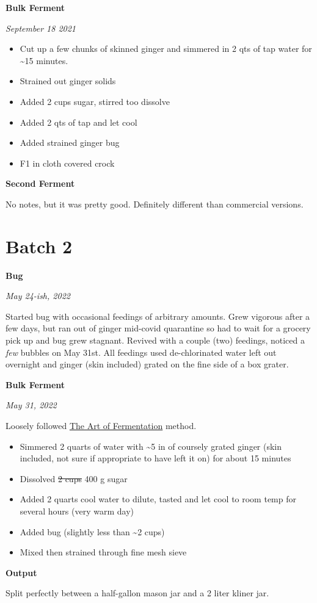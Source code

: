 \documentclass[
]{book}
\begin{document}
\textbf{Bulk Ferment}

\emph{September 18 2021}

\begin{itemize}
\item
  Cut up a few chunks of skinned ginger and simmered in 2 qts of tap water for \textasciitilde15 minutes.
\item
  Strained out ginger solids
\item
  Added 2 cups sugar, stirred too dissolve
\item
  Added 2 qts of tap and let cool
\item
  Added strained ginger bug
\item
  F1 in cloth covered crock
\end{itemize}

\textbf{Second Ferment}

No notes, but it was pretty good. Definitely different than commercial versions.

\hypertarget{batch-2}{%
\section{Batch 2}\label{batch-2}}

\textbf{Bug}

\emph{May 24-ish, 2022}

Started bug with occasional feedings of arbitrary amounts. Grew vigorous after a few days, but ran out of ginger mid-covid quarantine so had to wait for a grocery pick up and bug grew stagnant. Revived with a couple (two) feedings, noticed a \emph{few} bubbles on May 31st. All feedings used de-chlorinated water left out overnight and ginger (skin included) grated on the fine side of a box grater.

\textbf{Bulk Ferment}

\emph{May 31, 2022}

Loosely followed \href{https://www.wildfermentation.com/the-art-of-fermentation/}{The Art of Fermentation} method.

\begin{itemize}
\item
  Simmered 2 quarts of water with \textasciitilde5 in of coursely grated ginger (skin included, not sure if appropriate to have left it on) for about 15 minutes
\item
  Dissolved \sout{2 cups} 400 g sugar
\item
  Added 2 quarts cool water to dilute, tasted and let cool to room temp for several hours (very warm day)
\item
  Added bug (slightly less than \textasciitilde2 cups)
\item
  Mixed then strained through fine mesh sieve
\end{itemize}

\textbf{Output}

Split perfectly between a half-gallon mason jar and a 2 liter kliner jar.
\end{document}
